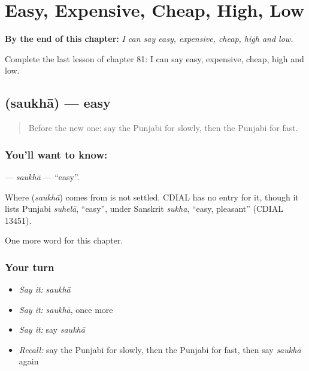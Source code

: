 
\chapter{Easy, Expensive, Cheap, High, Low}
\label{ch:pa-easy-expensive-cheap-high-low}

\begin{chapteropening}
\textbf{By the end of this chapter:} \emph{I can say easy, expensive, cheap, high and low.}

Complete the last lesson of chapter 81: I can say easy, expensive, cheap, high and low.
\end{chapteropening}

\section[\texorpdfstring{\pa{ਸੌਖਾ} (saukhā)}{ਸੌਖਾ (saukhā)}]{ (saukhā) — easy}

\label{lesson:PA-C81-saukha}



\begin{quote}
Before the new one: say the Punjabi for slowly, then the Punjabi for fast.
\end{quote}

\subsection*{You'll want to know: }
\textbf{} — \emph{saukhā} — \textquotedblleft{}easy\textquotedblright{}.

\begin{cousinweb}
Where \textbf{} (\emph{saukhā}) comes from is not settled. CDIAL has no entry for it, though it lists Punjabi \emph{suhelā}, \textquotedblleft{}easy\textquotedblright{}, under Sanskrit \emph{sukha}, \textquotedblleft{}easy, pleasant\textquotedblright{} (CDIAL 13451).
\end{cousinweb}

\begin{grammarlens}[title={What you've built}]
One more word for this chapter.
\end{grammarlens}

\subsection*{Your turn}
\begin{itemize}
\raggedright
  \item \emph{Say it:} \emph{saukhā}
  \item \emph{Say it:} \emph{saukhā}, once more
  \item \emph{Say it:} say \emph{saukhā}
  \item \emph{Recall:} say the Punjabi for slowly, then the Punjabi for fast, then say \emph{saukhā} again
\end{itemize}

